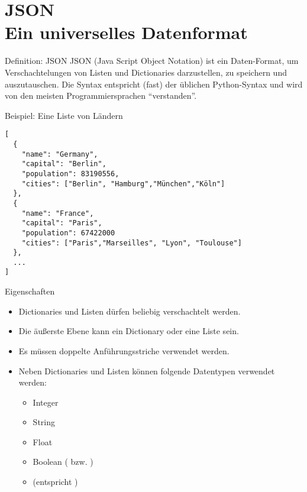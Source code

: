\section{JSON \\ \footnotesize Ein universelles Datenformat}

\begin{frame}

\begin{block}{Definition: JSON}
\vspace{2pt}	
JSON (Java Script Object Notation) ist ein Daten-Format, um Verschachtelungen von Listen und Dictionaries darzustellen, zu speichern und auszutauschen. Die Syntax entspricht (fast) der üblichen Python-Syntax und wird von den meisten Programmiersprachen \enquote{verstanden}.  
\end{block}
\end{frame}

\begin{fragile}
	
\begin{exampleblock}{Beispiel: Eine Liste von Ländern}
\vspace{2pt}
\begin{verbatim}
[
  {
    "name": "Germany",
    "capital": "Berlin",
    "population": 83190556,
    "cities": ["Berlin", "Hamburg","München","Köln"] 
  },
  {
    "name": "France", 
    "capital": "Paris",
    "population": 67422000
    "cities": ["Paris","Marseilles", "Lyon", "Toulouse"]
  },
  ...
]
\end{verbatim}
\end{exampleblock}
\end{fragile}

\begin{frame}
\begin{block}{Eigenschaften}
\vspace{2pt}
\pause 
\begin{itemize}[<+->]
	\item Dictionaries und Listen dürfen beliebig verschachtelt werden. 
	\item Die äußerste Ebene kann ein Dictionary oder eine Liste sein. 
	\item Es müssen doppelte Anführungsstriche verwendet werden. 
	\item Neben Dictionaries und Listen können folgende Datentypen verwendet werden: 
	\begin{itemize}
		\item Integer
		\item String
		\item Float
		\item Boolean ( bzw. )
		\item {} (entspricht )
	\end{itemize}
\end{itemize}
\end{block}
\end{frame}


